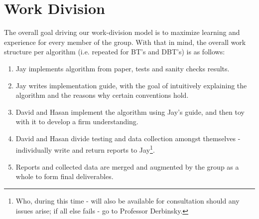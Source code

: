 \documentclass[10pt,letterpaper]{article}
\begin{document}
	\section{Work Division}
		The overall goal driving our work-division model is to maximize learning and experience for every member of the group. With that in mind, the overall work structure per algorithm (i.e. repeated for BT's and DBT's) is as follows:
		\begin{enumerate}
			\item Jay implements algorithm from paper, tests and sanity checks results.
			\item Jay writes implementation guide, with the goal of intuitively explaining the algorithm and the reasons why certain conventions hold.
			\item David and Hasan implement the algorithm using Jay's guide, and then toy with it to develop a firm understanding.
			\item David and Hasan divide testing and data collection amongst themselves - individually write and return reports to Jay\footnote{Who, during this time - will also be available for consultation should any issues arise; if all else fails - go to Professor Derbinsky.}.
			\item Reports and collected data are merged and augmented by the group as a whole to form final deliverables. 
		\end{enumerate}
\end{document}
